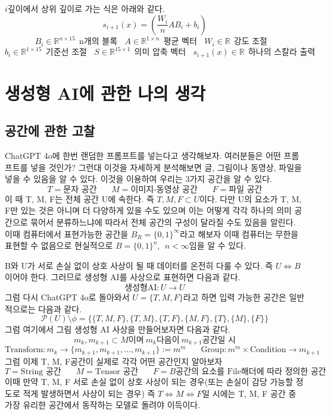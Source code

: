 \documentclass{book}
\begin{document}
\newpage

$i$깊이에서 상위 깊이로 가는 식은 아래와 같다.
\[
s_{i+1}(x)=\left( \frac{W_i}{n}AB_i+b_i \right)
\]
\[
B_i \in \mathbb{R}^{n \times 15}~~\text{n개의 블록}~~~~
A \in \mathbb{R}^{1 \times n}~~\text{평균 벡터}~~~~
W_i \in \mathbb{R}~~\text{강도 조절}~~~~
\]
\[
b_i \in \mathbb{R}^{1 \times 15}~~\text{기준선 조절}~~~~
S \in \mathbb{R}^{15 \times 1}~~\text{의미 압축 벡터}~~~~
s_{i+1}(x) \in \mathbb{R}~~\text{하나의 스칼라 출력}
\]

\part{생성형 AI에 관한 나의 생각}

\chapter{공간에 관한 고찰}

ChatGPT 4o에 한번 랜덤한 프롬프트를 넣는다고 생각해보자. 여러분들은 어떤 프롬프트를 넣을 것인가? 그런대 이것을 자세하게 분석해보면 글, 그림이나 동영상, 파일을 넣을 수 있음을 알 수 있다. 이것을 이용하여 우리는 3가지 공간을 알 수 있다.
\[
T=\text{문자 공간}~~~~ ~~~~
M=\text{이미지-동영상 공간}~~~~ ~~~~
F=\text{파일 공간}
\]
이 때 T, M, F는 전체 공간 U에 속한다. 즉 $T, M, F \subset U$이다. 다만 U의 요소가 T, M, F만 있는 것은 아니며 더 다양하게 있을 수도 있으며 이는 어떻게 각각 하나의 의미 공간으로 묶어서 분류하느냐에 따라서 전체 공간의 구성이 달라질 수도 있음을 알린다.
\newline\newline
이때 컴퓨터에서 표현가능한 공간을 $B_R=\{0,1\}^\infty$라고 해보자 이때 컴퓨터는 무한을 표현할 수 없음으로 현실적으로 $B=\{0,1\}^n,~~n < \infty$임을 알 수 있다.

B와 U가 서로 손실 없이 상호 사상이 될 때 데이터를 온전히 다룰 수 있다. 즉 $U \Leftrightarrow B$이어야 한다. 그러므로 생성형 AI를 사상으로 표현하면 다음과 같다.
\[
\text{생성형AI} : U \rightarrow U
\]
그럼 다시 ChatGPT 4o로 돌아와서 $U=\{T,M,F\}$라고 하면 입력 가능한 공간은 일반적으로는 다음과 같다.
\[
\mathcal{P}(U) \setminus \phi = \{ \{ T,M,F \}, \{ T,M \}, \{ T, F \}, \{ M, F \},\{ T \}, \{ M \}, \{ F \} \}
\]
그럼 여기에서 그림 생성형 AI 사상을 만들어보자면 다음과 같다.
\[
m_k, m_{k+1} \subset M \text{이며}~ m_k \text{다음이}~ m_{k+1} \text{공간일 시}
\]
\[
\text{Transform} : m_k \rightarrow \{m_{k+1}, m_{k+1}, \ldots , m_{k+1}\} := m^m~~~~ ~~~~
\text{Group} : m^m \times \text{Condition} \rightarrow m_{k+1}
\]
그럼 이제 T, M, F공간이 실제로 각각 어떤 공간인지 알아보자
\[
T=\text{String 공간}~~~~ ~~~~
M=\text{Tensor 공간}~~~~ ~~~~
F=B\text{공간의 요소를 File해더에 따라 정의한 공간}
\]
이때 만약 T, M, F 서로 손실 없이 상호 사상이 되는 경우(또는 손실이 감당 가능할 정도로 적게 발생하면서 사상이 되는 경우) 즉 $T \Leftrightarrow M \Leftrightarrow F$일 시에는 T, M, F 공간 중 가장 유리한 공간에서 동작하는 모델로 돌려야 이득이다.
\end{document}
